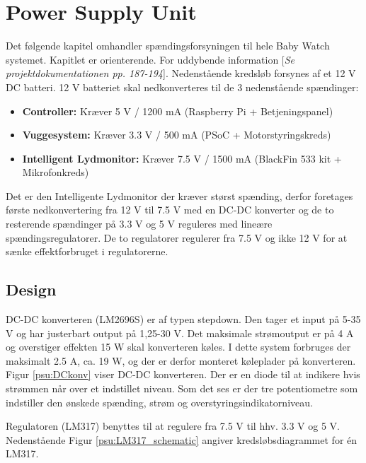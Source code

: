 \chapter{Power Supply Unit}

Det følgende kapitel omhandler spændingsforsyningen til hele Baby Watch systemet. Kapitlet er orienterende. For uddybende information [\textit{Se projektdokumentationen pp. 187-194}]. Nedenstående kredsløb forsynes af et 12 V DC batteri. 12 V batteriet skal nedkonverteres til de 3 nedenstående spændinger: 
\begin{itemize}
\item \textbf{Controller:} Kræver 5 V / 1200 mA (Raspberry Pi + Betjeningspanel)

\item \textbf{Vuggesystem:} Kræver 3.3 V / 500 mA (PSoC + Motorstyringskreds)

\item \textbf{Intelligent Lydmonitor:} Kræver 7.5 V / 1500 mA (BlackFin 533 kit + Mikrofonkreds)
\end{itemize}

Det er den Intelligente Lydmonitor der kræver størst spænding, derfor foretages første nedkonvertering fra 12 V til 7.5 V med en DC-DC konverter og de to resterende spændinger på 3.3 V og 5 V reguleres med lineære spændingsregulatorer. De to regulatorer regulerer fra 7.5 V og ikke 12 V for at sænke effektforbruget i regulatorerne. 

\section{Design}

DC-DC konverteren (LM2696S) er af typen stepdown. Den tager et input på 5-35 V og har justerbart output på 1,25-30 V. Det maksimale strømoutput er på 4 A og overstiger effekten 15 W skal konverteren køles. I dette system forbruges der maksimalt 2.5 A, ca. 19 W, og der er derfor monteret køleplader på konverteren. Figur \ref{psu:DCkonv} viser DC-DC konverteren. Der er en diode til at indikere hvis strømmen når over et indstillet niveau. Som det ses er der tre potentiometre som indstiller den ønskede spænding, strøm og overstyringsindikatorniveau.  


\newpage

Regulatoren (LM317) benyttes til at regulere fra 7.5 V til hhv. 3.3 V og 5 V. Nedenstående Figur \ref{psu:LM317_schematic} angiver kredsløbsdiagrammet for én LM317.

